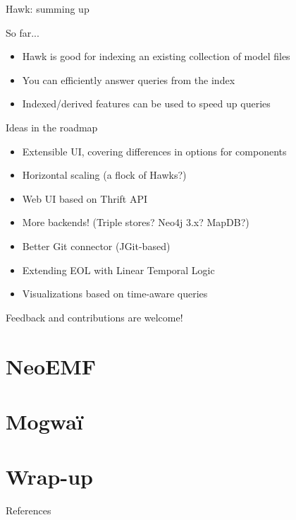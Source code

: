 \begin{frame}{Hawk: summing up}

  \begin{block}{So far...}
    \begin{itemize}
    \item Hawk is good for indexing an existing collection of model files
    \item You can efficiently answer queries from the index
    \item Indexed/derived features can be used to speed up queries
    \end{itemize}
  \end{block}

  \begin{block}{Ideas in the roadmap}
    \begin{itemize}
    \item Extensible UI, covering differences in options for components
    \item Horizontal scaling (a flock of Hawks?)
    \item Web UI based on Thrift API
    \item More backends! (Triple stores? Neo4j 3.x? MapDB?)
    \item Better Git connector (JGit-based)
    \item Extending EOL with Linear Temporal Logic
    \item Visualizations based on time-aware queries
    \end{itemize}

    Feedback and contributions are welcome!
  \end{block}

\end{frame}

\section{NeoEMF}

\section{Mogwa\"i}

\section{Wrap-up}

\begin{frame}[allowframebreaks]{References}

  
  

\end{frame}


